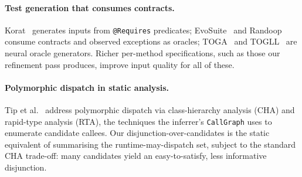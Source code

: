 \paragraph{Test generation that consumes contracts.}
Korat~\cite{boyapati2002korat} generates inputs from \texttt{@Requires} predicates; EvoSuite~\cite{fraser2011evosuite} and Randoop~\cite{pacheco2007randoop} consume contracts and observed exceptions as oracles; TOGA~\cite{dinella2022toga} and TOGLL~\cite{hossain2024togll} are neural oracle generators. Richer per-method specifications, such as those our refinement pass produces, improve input quality for all of these.

\paragraph{Polymorphic dispatch in static analysis.}
Tip et al.~\cite{tip2002practical} address polymorphic dispatch via
class-hierarchy analysis (CHA) and rapid-type analysis (RTA), the
techniques the inferrer's \texttt{CallGraph} uses to enumerate
candidate callees. Our disjunction-over-candidates is the static
equivalent of summarising the runtime-may-dispatch set, subject to
the standard CHA trade-off: many candidates yield an easy-to-satisfy,
less informative disjunction.


